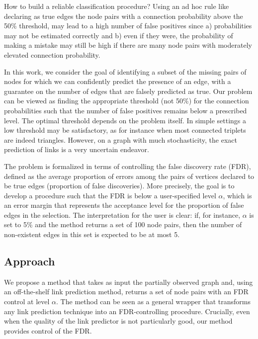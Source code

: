 \documentclass[a4paper, 11pt]{article}
\theoremstyle{remark}
\begin{document}
How to build a reliable classification procedure? 
Using an ad hoc rule like declaring as true edges the node pairs with a connection probability above the 50\% threshold, may lead to a high number of false positives since a) probabilities may not be estimated correctly and b) even if they were, the probability of making a mistake may still be high if 
there are many node pairs with moderately elevated connection probability. 


In this work, we consider the goal of identifying a subset of the missing pairs of nodes for which we can confidently predict the presence of an edge, with a guarantee on the number of edges that are falsely predicted as true. 
Our problem can be viewed as finding the appropriate threshold (not 50\%) for the connection probabilities such that the number of false positives remains below a prescribed level. The optimal threshold depends on the problem itself. In simple settings a low threshold may be satisfactory, as for instance when most connected triplets are indeed triangles. However, on a graph with much stochasticity, the exact prediction of links is a very uncertain endeavor.

The problem is formalized in terms of controlling the false discovery rate (FDR), defined as the average proportion of errors among the pairs of vertices declared to be true edges (proportion of false discoveries). More precisely, the goal is to develop a procedure such that the FDR is below a user-specified level $\alpha$, which is an error margin that represents the acceptance level for the proportion of false edges in the selection. 
The interpretation for the user is clear: if, for instance, $\alpha$ is set to 5\% and the method returns a set of 100 node pairs, then the number of non-existent edges in this set is expected to be at most 5. 



\subsection{Approach}


We propose a method that takes as input the partially observed graph and, using an off-the-shelf link prediction method, returns a set of node pairs with an FDR control at level $\alpha$. The method can be seen as a general wrapper that transforms any link prediction technique into an FDR-controlling procedure. 
Crucially, even when the quality of the link predictor is not particularly good, our method provides control of the FDR.
\end{document}
